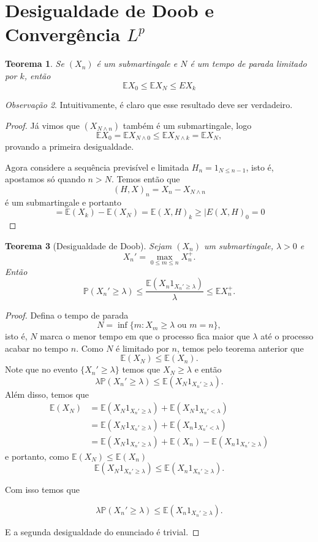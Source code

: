 \documentclass[12pt,a4paper,oneside]{book}
\newtheorem{theorem}{Teorema}[section]
\theoremstyle{definition}
\theoremstyle{remark}
\newtheorem{remark}[theorem]{Observa\c{c}\~ao}
\numberwithin{equation}{section}
\newcommand{\E}{\mathbb{E}}
\newcommand{\pr}{\mathbb{P}}
\begin{document}
\newpage
\section{Desigualdade de Doob e Convergência $L^p$}



\begin{theorem}
Se $(X_n)$ é um submartingale e $N$ é um tempo de parada limitado por $k$, então
$$\E X_0 \leq \E X_N \leq E X_k $$
\end{theorem}
\begin{remark}
Intuitivamente, é claro que  esse resultado deve ser verdadeiro.
\end{remark}


\begin{proof}
 Já vimos que $(X_{N\wedge n})$ também é um submartingale, logo 
 $$\E X_0 = \E X_{N\wedge 0} \leq \E X_{N\wedge k} = \E X_N,  $$
 provando a primeira desigualdade. 
 
Agora considere a sequência previsível e limitada $H_n = 1_{N\leq n-1}$, isto é, apostamos só quando $n>N$. Temos então que 
$$(H,X)_n = X_{n}- X_{N\wedge n} $$
 é um submartingale e portanto
 $$ = \E(X_k) - \E(X_N) =  \E(X,H)_k\geq |E(X,H)_0 = 0$$
\end{proof}






\begin{theorem}[Desigualdade de Doob] \label{teodesigdoob}   
Sejam $(X_n)$ um submartingale, $\lambda>0$ e
$$X_n'  = \max_{0\leq m\leq n}X_n^+.$$
Então
$$\pr (X_n'\geq \lambda)\leq \dfrac{\E (X_n 1_{X_n'\geq \lambda}) }{\lambda}\leq \E X_n^+. $$
\end{theorem}
\begin{proof}
Defina o tempo de parada
$$N = \inf\{m: X_m \geq \lambda \textrm{ ou } m=n \}, $$
isto é, $N$ marca o menor tempo em que o processo fica maior que $\lambda$ até o processo acabar no tempo $n$. Como $N$ é limitado por $n$, temos pelo teorema anterior que
$$\E(X_N) \leq \E(X_n). $$ 
Note que  no evento $\{X_n'\geq \lambda\}$ temos que $X_N\geq \lambda $ e então
$$\lambda \pr({X_n'\geq \lambda}) \leq \E(X_N 1_{X_n'\geq \lambda} ). $$
Além disso, temos que
\begin{align*}
\E(X_N) &= \E(X_N 1_{X_n'\geq \lambda}) + \E(X_N 1_{X_n'< \lambda})\\
& = \E(X_N 1_{X_n'\geq \lambda}) +\E(X_n 1_{X_n'< \lambda})\\
& = \E(X_N 1_{X_n'\geq \lambda}) + \E (X_n) - \E(X_n 1_{X_n'\geq \lambda})
\end{align*}
e portanto, como $\E(X_N)\leq \E(X_n)$
$$\E(X_N 1_{X_n'\geq \lambda})  \leq \E(X_n 1_{X_n'\geq \lambda}).  $$

Com isso temos que

$$\lambda \pr({X_n'\geq \lambda}) \leq \E(X_n  1_{X_n'\geq \lambda} ). $$

E a segunda desigualdade do enunciado é trivial.
\end{proof}
\end{document}
